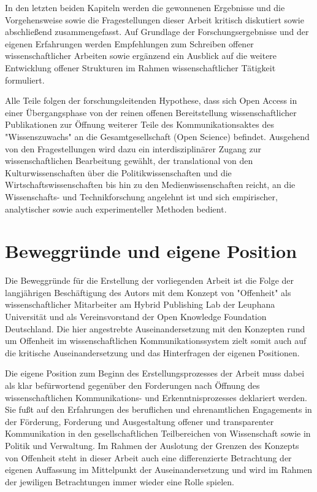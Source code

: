 In den letzten beiden Kapiteln werden die gewonnenen Ergebnisse und die Vorgehensweise sowie die Fragestellungen dieser Arbeit kritisch diskutiert sowie abschließend zusammengefasst. Auf Grundlage der Forschungsergebnisse und der eigenen Erfahrungen werden Empfehlungen zum Schreiben offener wissenschaftlicher Arbeiten sowie ergänzend ein Ausblick auf die weitere Entwicklung offener Strukturen im Rahmen wissenschaftlicher Tätigkeit formuliert.

Alle Teile folgen der forschungsleitenden Hypothese, dass sich Open Access in einer Übergangsphase von der reinen offenen Bereitstellung wissenschaftlicher Publikationen zur Öffnung weiterer Teile des Kommunikationsaktes des "Wissenszuwachs" \cite{Luhmann_1998} an die Gesamtgesellschaft (Open Science) befindet. Ausgehend von den Fragestellungen wird dazu ein interdisziplinärer Zugang zur wissenschaftlichen Bearbeitung gewählt, der translational von den Kulturwissenschaften über die Politikwissenschaften und die Wirtschaftswissenschaften bis hin zu den Medienwissenschaften reicht, an die Wissenschafts- und Technikforschung angelehnt ist und sich empirischer, analytischer sowie auch experimenteller Methoden bedient.

\section{Beweggründe und eigene Position}

Die Beweggründe für die Erstellung der vorliegenden Arbeit ist die Folge der langjährigen Beschäftigung des Autors mit dem Konzept von "Offenheit" als wissenschaftlicher Mitarbeiter am Hybrid Publishing Lab der Leuphana Universität und als Vereinsvorstand der Open Knowledge Foundation Deutschland. Die hier angestrebte Auseinandersetzung mit den Konzepten rund um Offenheit im wissenschaftlichen Kommunikationssystem zielt somit auch auf die kritische Auseinandersetzung und das Hinterfragen der eigenen Positionen.

Die eigene Position zum Beginn des Erstellungsprozesses der Arbeit muss dabei als klar befürwortend gegenüber den Forderungen nach Öffnung des wissenschaftlichen Kommunikations- und Erkenntnisprozesses deklariert werden. Sie fußt auf den Erfahrungen des beruflichen und ehrenamtlichen Engagements in der Förderung, Forderung und Ausgestaltung offener und transparenter Kommunikation in den gesellschaftlichen Teilbereichen von Wissenschaft sowie in Politik und Verwaltung. Im Rahmen der Auslotung der Grenzen des Konzepts von Offenheit steht in dieser Arbeit auch eine differenzierte Betrachtung der eigenen Auffassung im Mittelpunkt der Auseinandersetzung und wird im Rahmen der jewiligen Betrachtungen immer wieder eine Rolle spielen.

